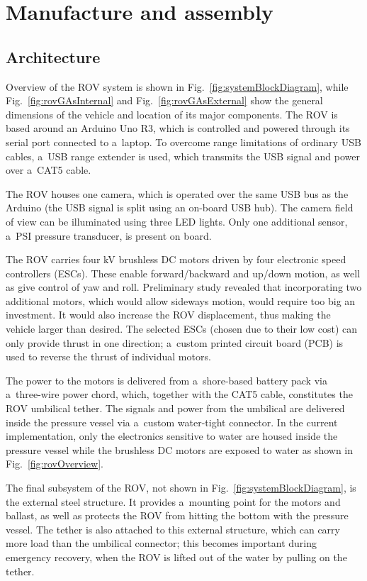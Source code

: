 \pagestyle{chapter-fancy-style}
\chapter{Manufacture and assembly}
\section{Architecture}
Overview of the ROV system is shown in Fig.~\ref{fig:systemBlockDiagram}, while Fig.~\ref{fig:rovGAsInternal} and Fig.~\ref{fig:rovGAsExternal} show the general dimensions of the vehicle and location of its major components. The ROV is based around an Arduino Uno R3, which is controlled and powered through its serial port connected to a~laptop. To overcome range limitations of ordinary USB cables, a~USB range extender is used, which transmits the USB signal and power over a~CAT5 cable.

The ROV houses one camera, which is operated over the same USB bus as the Arduino (the USB signal is split using an on-board USB hub). The camera field of view can be illuminated using three LED lights. Only one additional sensor, a~\unit[30]{PSI} pressure transducer, is present on board.

The ROV carries four \unit[750]{kV} brushless DC motors driven by four electronic speed controllers (ESCs). These enable forward/backward and up/down motion, as well as give control of yaw and roll. Preliminary study revealed that incorporating two additional motors, which would allow sideways motion, would require too big an investment. It would also increase the ROV displacement, thus making the vehicle larger than desired. The selected ESCs (chosen due to their low cost) can only provide thrust in one direction; a~custom printed circuit board (PCB) is used to reverse the thrust of individual motors.

The power to the motors is delivered from a~shore-based battery pack via a~three-wire power chord, which, together with the CAT5 cable, constitutes the ROV umbilical tether. The signals and power from the umbilical are delivered inside the pressure vessel via a~custom water-tight connector. In the current implementation, only the electronics sensitive to water are housed inside the pressure vessel while the brushless DC motors are exposed to water as shown in Fig.~\ref{fig:rovOverview}.

The final subsystem of the ROV, not shown in Fig.~\ref{fig:systemBlockDiagram}, is the external steel structure. It provides a~mounting point for the motors and ballast, as well as protects the ROV from hitting the bottom with the pressure vessel. The tether is also attached to this external structure, which can carry more load than the umbilical connector; this becomes important during emergency recovery, when the ROV is lifted out of the water by pulling on the tether.

